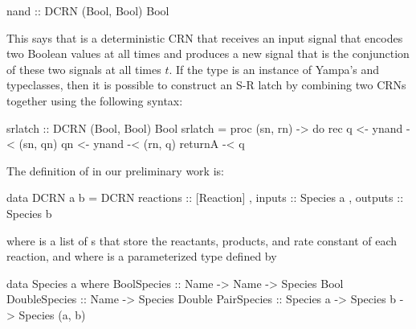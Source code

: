 \begin{haskellcode}
nand :: DCRN (Bool, Bool) Bool
\end{haskellcode}

This says that  is a deterministic CRN that receives an input signal that encodes two Boolean values at all times and produces a new signal that is the conjunction of these two signals at all times \( t \).
If the  type is an instance of Yampa's  and  typeclasses, then it is possible to construct an S-R latch by combining two  CRNs together using the following syntax:

\begin{haskellcode}
srlatch :: DCRN (Bool, Bool) Bool
srlatch = proc (sn, rn) -> do
    rec q  <- ynand -< (sn, qn)
        qn <- ynand -< (rn, q)
    returnA -< q
\end{haskellcode}

The definition of  in our preliminary work is:
\begin{haskellcode}
data DCRN a b = DCRN { reactions :: [Reaction]
                     , inputs    :: Species a
                     , outputs   :: Species b  }
\end{haskellcode}
where  is a list of s that store the reactants, products, and rate constant of each reaction, and where  is a parameterized type defined by
\begin{haskellcode}
    data Species a where
        BoolSpecies   :: Name -> Name -> Species Bool
        DoubleSpecies :: Name -> Species Double
        PairSpecies   :: Species a -> Species b -> Species (a, b)
\end{haskellcode}




